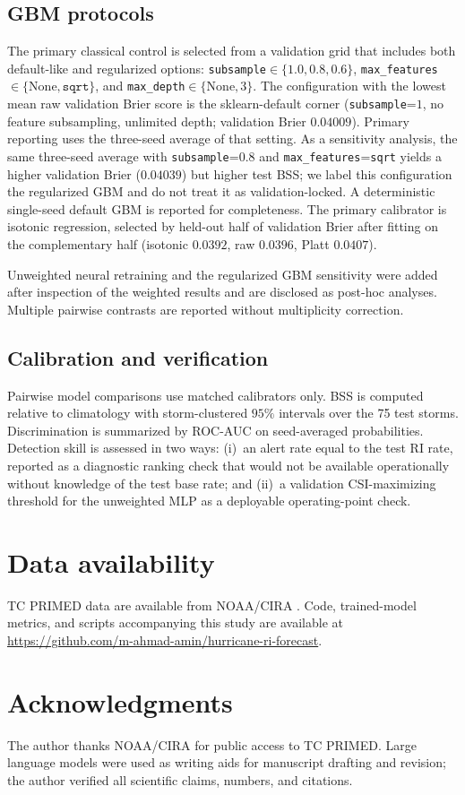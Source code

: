 \documentclass[11pt]{article}
\begin{document}
\subsection{GBM protocols}

The primary classical control is selected from a validation grid that includes both default-like and regularized options: \texttt{subsample}$\in\{1.0,0.8,0.6\}$, \texttt{max\_features}$\in\{\mathrm{None},\texttt{sqrt}\}$, and \texttt{max\_depth}$\in\{\mathrm{None},3\}$. The configuration with the lowest mean raw validation Brier score is the sklearn-default corner (\texttt{subsample}=$1$, no feature subsampling, unlimited depth; validation Brier $0.04009$). Primary reporting uses the three-seed average of that setting. As a sensitivity analysis, the same three-seed average with \texttt{subsample}=$0.8$ and \texttt{max\_features}=\texttt{sqrt} yields a higher validation Brier ($0.04039$) but higher test BSS; we label this configuration the regularized GBM and do not treat it as validation-locked. A deterministic single-seed default GBM is reported for completeness. The primary calibrator is isotonic regression, selected by held-out half of validation Brier after fitting on the complementary half (isotonic $0.0392$, raw $0.0396$, Platt $0.0407$).

Unweighted neural retraining and the regularized GBM sensitivity were added after inspection of the weighted results and are disclosed as post-hoc analyses. Multiple pairwise contrasts are reported without multiplicity correction.

\subsection{Calibration and verification}

Pairwise model comparisons use matched calibrators only. BSS is computed relative to climatology with storm-clustered $95\%$ intervals over the 75 test storms. Discrimination is summarized by ROC-AUC on seed-averaged probabilities. Detection skill is assessed in two ways: (i)~an alert rate equal to the test RI rate, reported as a diagnostic ranking check that would not be available operationally without knowledge of the test base rate; and (ii)~a validation CSI-maximizing threshold for the unweighted MLP as a deployable operating-point check.

\section*{Data availability}
{TC PRIMED} data are available from NOAA/CIRA \citep{razin2023,tcprimed}. Code, trained-model metrics, and scripts accompanying this study are available at \url{https://github.com/m-ahmad-amin/hurricane-ri-forecast}.

\section*{Acknowledgments}
The author thanks NOAA/CIRA for public access to {TC PRIMED}. Large language models were used as writing aids for manuscript drafting and revision; the author verified all scientific claims, numbers, and citations.



\end{document}
